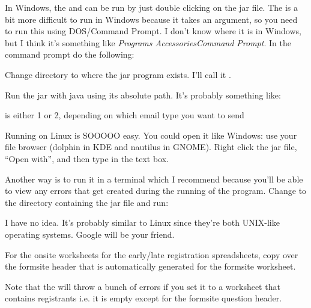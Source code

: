 \documentclass[12pt,final]{article}
\begin{document}
In Windows, the  and
 can be run by just double clicking on the jar file.
The  is a bit more difficult to run in Windows because it
takes an argument, so you need to run this using DOS/Command Prompt. I don't
know where it is in Windows, but I think it's something like \emph{Programs\ra
Accessories\ra Command Prompt}. In the command prompt do the following:
\benum
	\item Change directory to where the  jar program exists.
		I'll call it .
	\item Run the jar with java using its absolute path. It's probably something like:
	\item {} is either 1 or 2, depending on which email type you want to send
\eenum


Running on Linux is SOOOOO easy. You could open it like Windows: use your file
browser (dolphin in KDE and nautilus in GNOME). Right click the jar file, ``Open
with'', and then type  in the text box. 

Another way is to run it in a terminal which I recommend because you'll be able
to view any errors that get created during the running of the program. Change
to the directory containing the jar file and run:
\bitem
\eitem


I have no idea. It's probably similar to Linux since they're both UNIX-like
operating systems. Google will be your friend.


For the onsite worksheets for the early/late registration spreadsheets, copy
over the formsite header that is automatically generated for the formsite
worksheet.

Note that the  will throw a bunch of errors if you set
it to a worksheet that contains  registrants i.e. it is empty except for
the formsite question header.

\end{document}
